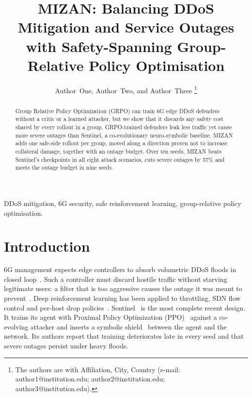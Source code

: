 \documentclass[journal]{IEEEtran}
\begin{document}
\title{MIZAN: Balancing DDoS Mitigation and Service Outages with Safety-Spanning Group-Relative Policy Optimisation}

\author{Author~One, Author~Two, and Author~Three%
\thanks{The authors are with Affiliation, City, Country (e-mail: author1@institution.edu; author2@institution.edu; author3@institution.edu).}}


\maketitle

\begin{abstract}
Group Relative Policy Optimization (GRPO) can train 6G edge DDoS defenders without a critic or a learned attacker, but we show that it discards any safety cost shared by every rollout in a group. GRPO-trained defenders leak less traffic yet cause more severe outages than Sentinel, a co-evolutionary neuro-symbolic baseline. MIZAN adds one safe-side rollout per group, moved along a direction proven not to increase collateral damage, together with an outage budget. Over ten seeds, MIZAN beats Sentinel's checkpoints in all eight attack scenarios, cuts severe outages by 57\% and meets the outage budget in nine seeds.
\end{abstract}

\begin{IEEEkeywords}
DDoS mitigation, 6G security, safe reinforcement learning, group-relative policy optimisation.
\end{IEEEkeywords}

\section{Introduction}
 6G management expects edge controllers to absorb volumetric DDoS floods in closed loop~\cite{benzaid2020zsm,liyanage2023oran}. Such a controller must discard hostile traffic without starving legitimate users: a filter that is too aggressive causes the outage it was meant to prevent~\cite{guo2020xai6g}. Deep reinforcement learning has been applied to throttling, SDN flow control and per-host drop policies~\cite{malialis2015distributed,liu2018drlddos,simpson2020perhost}. Sentinel~\cite{alfatemi2026sentinel} is the most complete recent design. It trains its agent with Proximal Policy Optimization (PPO)~\cite{schulman2017ppo} against a co-evolving attacker and inserts a symbolic shield~\cite{alshiekh2018shielding} between the agent and the network. Its authors report that training deteriorates late in every seed and that severe outages persist under heavy floods.
\end{document}
